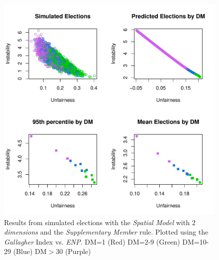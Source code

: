 \documentclass{article}
\begin{document}
\begin{figure}[]
\includegraphics[scale=1.00]{images/sm_spatial2_gallagher_enp.pdf}
\caption{Results from simulated elections with the \emph{Spatial Model} with \emph{$2$ dimensions} and the \emph{Supplementary Member} rule. Plotted using the \emph{Gallagher} Index vs. \emph{ENP}. DM=1 (Red) DM=2-9 (Green) DM=10-29 (Blue) DM$>$30 (Purple)}
\label{fig:sm_spatial2}
\end{figure}
\end{document}
